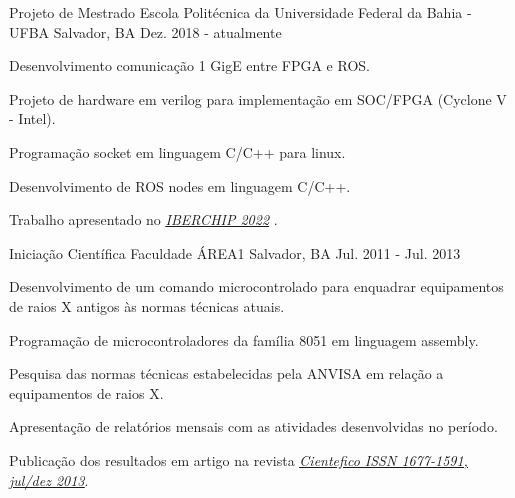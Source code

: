 \begin{cventries}
  \cventry
    {Projeto de Mestrado} %
    {Escola Politécnica da Universidade Federal da Bahia - UFBA} %
    {Salvador, BA} %
    {Dez. 2018 - atualmente} %
    {
      \begin{cvitems} %
        \item {Desenvolvimento comunicação 1 GigE entre FPGA e ROS.}
        \item {Projeto de hardware em verilog para implementação em SOC/FPGA (Cyclone V - Intel).}
        \item {Programação socket em linguagem C/C++ para linux.}
        \item {Desenvolvimento de ROS nodes em linguagem C/C++.}
        \item {Trabalho apresentado no  \underline{\href{https://ieee-lascas.org/}{\emph{IBERCHIP 2022}}} .}
      \end{cvitems}
    }

  \cventry
    {Iniciação Científica} %
    {Faculdade ÁREA1} %
    {Salvador, BA} %
    {Jul. 2011 - Jul. 2013} %
    {
      \begin{cvitems} %
        \item {Desenvolvimento de um comando microcontrolado para enquadrar equipamentos de raios X antigos às normas técnicas atuais.}
        \item {Programação de microcontroladores da família 8051 em linguagem assembly.}
        \item {Pesquisa das normas técnicas estabelecidas pela ANVISA em relação a equipamentos de raios X.}
        \item {Apresentação de relatórios mensais com as atividades desenvolvidas no período.}
        \item {Publicação dos resultados em artigo na revista \underline{\href{https://cientefico.emnuvens.com.br/cientefico/article/view/58}{\emph{Cientefico ISSN 1677-1591, jul/dez 2013}}}.}
      \end{cvitems}
    }
    

\end{cventries}

